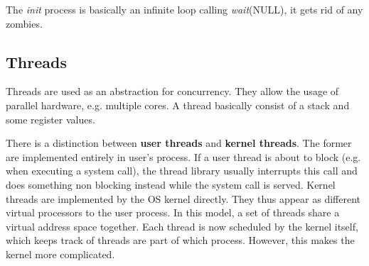 The \textit{init} process is basically an infinite loop calling \textit{wait}(NULL), it gets rid of any zombies.


\subsection{Threads}

Threads are used as an abstraction for concurrency. They allow the usage of parallel hardware, e.g. multiple cores. A thread basically consist of a stack and some register values.\medskip

There is a distinction between \textbf{user threads} and \textbf{kernel threads}. The former are implemented entirely in user’s process. If a user thread is about to block (e.g. when executing a system call), the thread library usually interrupts this call and does something non blocking instead while the system call is served. Kernel threads are implemented by the OS kernel directly. They thus appear as different virtual processors to the user process. In this model, a set of threads share a virtual address space together. Each thread is now scheduled by the kernel itself, which keeps track of threads are part of which process. However, this makes the kernel more complicated.
